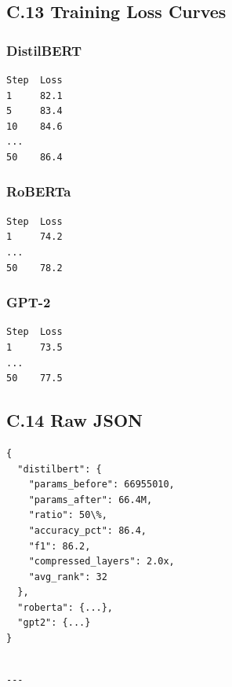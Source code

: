 \subsection{C.13 Training Loss Curves}

\subsubsection{DistilBERT}
\begin{lstlisting}
Step  Loss
1     82.1
5     83.4
10    84.6
...
50    86.4
\end{lstlisting}

\subsubsection{RoBERTa}
\begin{lstlisting}
Step  Loss
1     74.2
...
50    78.2
\end{lstlisting}

\subsubsection{GPT-2}
\begin{lstlisting}
Step  Loss
1     73.5
...
50    77.5
\end{lstlisting}

\subsection{C.14 Raw JSON}

\begin{lstlisting}
{
  "distilbert": {
    "params_before": 66955010,
    "params_after": 66.4M,
    "ratio": 50\%,
    "accuracy_pct": 86.4,
    "f1": 86.2,
    "compressed_layers": 2.0x,
    "avg_rank": 32
  },
  "roberta": {...},
  "gpt2": {...}
}
\end{lstlisting}
\begin{lstlisting}

---
\end{lstlisting}